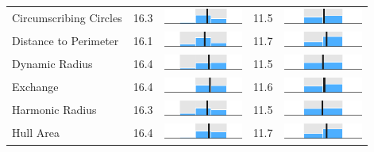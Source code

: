 \begin{table}
\begin{tabular}{l rm{7em} rm{7em}}
Circumscribing Circles &  16.3 &        \includegraphics[width=7em]{mini_hist/IL_2008_reock} &  11.5 &        \includegraphics[width=7em]{mini_hist/IL_2016_reock} \\
Distance to Perimeter  &  16.1 &     \includegraphics[width=7em]{mini_hist/IL_2008_rohrbach} &  11.7 &     \includegraphics[width=7em]{mini_hist/IL_2016_rohrbach} \\
Dynamic Radius         &  16.4 &   \includegraphics[width=7em]{mini_hist/IL_2008_dyn_radius} &  11.5 &   \includegraphics[width=7em]{mini_hist/IL_2016_dyn_radius} \\
Exchange               &  16.4 &     \includegraphics[width=7em]{mini_hist/IL_2008_exchange} &  11.6 &     \includegraphics[width=7em]{mini_hist/IL_2016_exchange} \\
Harmonic Radius        &  16.3 &  \includegraphics[width=7em]{mini_hist/IL_2008_harm_radius} &  11.5 &  \includegraphics[width=7em]{mini_hist/IL_2016_harm_radius} \\
Hull Area              &  16.4 &       \includegraphics[width=7em]{mini_hist/IL_2008_hull_a} &  11.7 &       \includegraphics[width=7em]{mini_hist/IL_2016_hull_a} \\

\end{tabular}
\end{table}
